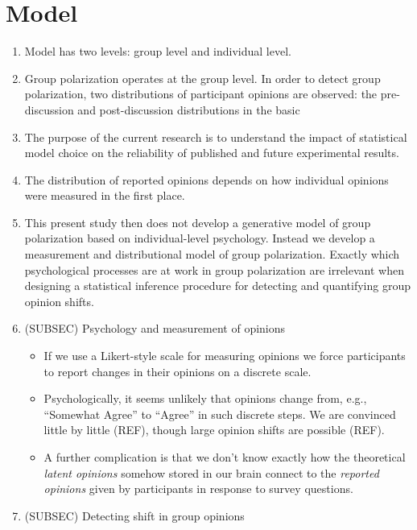 \documentclass[11pt,letterpaper]{article}
\begin{document}
\section{Model}

\begin{enumerate}
  \item 
    Model has two levels: group level and individual level. 
  \item 
    Group polarization operates at the group level. In order to
    detect group polarization, two distributions of participant opinions
    are observed: the pre-discussion and post-discussion distributions in the
    basic
  \item 
    The purpose of the current research is to understand the impact of 
    statistical model choice on the reliability of published and future
    experimental results. 
  \item 
    The distribution of reported opinions depends on
    how individual opinions were measured in the first place. 
  \item 
    This present
    study then does not develop a generative model of group polarization
    based on individual-level psychology. Instead we develop a measurement
    and distributional model of group polarization. Exactly which psychological
    processes are at work in group polarization are irrelevant when designing
    a statistical inference procedure for detecting and quantifying 
    group opinion shifts.
  \item 
    (SUBSEC) Psychology and measurement of opinions
    \begin{itemize}
      \item 
        If we use a Likert-style scale for measuring opinions we force 
        participants to report changes in their opinions on a discrete scale.
      \item Psychologically, it seems unlikely that opinions change from,
        e.g., ``Somewhat Agree'' to ``Agree'' in such discrete steps. We
        are convinced little by little (REF), though large opinion shifts
        are possible (REF).
      \item
        A further complication is that we don't know exactly how the 
        theoretical \emph{latent opinions} somehow stored in our brain connect
        to the \emph{reported opinions} given by participants in response
        to survey questions.
    \end{itemize}
  \item
    (SUBSEC) Detecting shift in group opinions
    

\end{enumerate}
\end{document}
